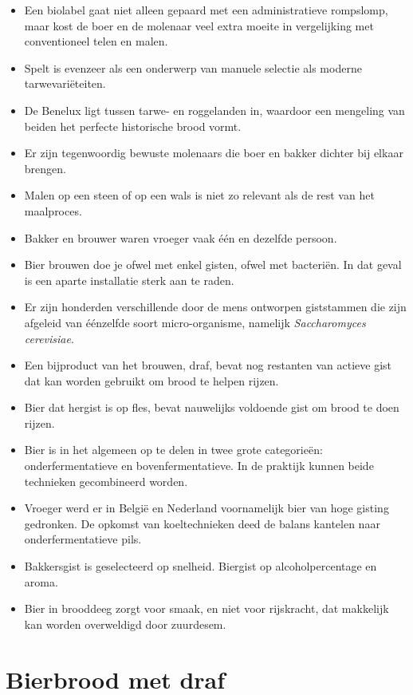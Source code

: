\documentclass[
  11pt,
  dutch,
]{memoir}
\providecommand{\tightlist}{%
  \setlength{\itemsep}{0pt}\setlength{\parskip}{0pt}}
\begin{document}
\begin{itemize}
\tightlist
\item
  Een biolabel gaat niet alleen gepaard met een administratieve
  rompslomp, maar kost de boer en de molenaar veel extra moeite in
  vergelijking met conventioneel telen en malen.
\item
  Spelt is evenzeer als een onderwerp van manuele selectie als moderne
  tarwevariëteiten.
\item
  De Benelux ligt tussen tarwe- en roggelanden in, waardoor een
  mengeling van beiden het perfecte historische brood vormt.
\item
  Er zijn tegenwoordig bewuste molenaars die boer en bakker dichter bij
  elkaar brengen.
\item
  Malen op een steen of op een wals is niet zo relevant als de rest van
  het maalproces.
\item
  Bakker en brouwer waren vroeger vaak één en dezelfde persoon.
\item
  Bier brouwen doe je ofwel met enkel gisten, ofwel met bacteriën. In
  dat geval is een aparte installatie sterk aan te raden.
\item
  Er zijn honderden verschillende door de mens ontworpen giststammen die
  zijn afgeleid van éénzelfde soort micro-organisme, namelijk
  \emph{Saccharomyces cerevisiae}.
\item
  Een bijproduct van het brouwen, draf, bevat nog restanten van actieve
  gist dat kan worden gebruikt om brood te helpen rijzen.
\item
  Bier dat hergist is op fles, bevat nauwelijks voldoende gist om brood
  te doen rijzen.
\item
  Bier is in het algemeen op te delen in twee grote categorieën:
  onderfermentatieve en bovenfermentatieve. In de praktijk kunnen beide
  technieken gecombineerd worden.
\item
  Vroeger werd er in België en Nederland voornamelijk bier van hoge
  gisting gedronken. De opkomst van koeltechnieken deed de balans
  kantelen naar onderfermentatieve pils.
\item
  Bakkersgist is geselecteerd op snelheid. Biergist op alcoholpercentage
  en aroma.
\item
  Bier in brooddeeg zorgt voor smaak, en niet voor rijskracht, dat
  makkelijk kan worden overweldigd door zuurdesem.
\end{itemize}

\newpage

\hypertarget{bierbrood-met-draf}{%
\section{Bierbrood met draf}\label{bierbrood-met-draf}}
\end{document}
